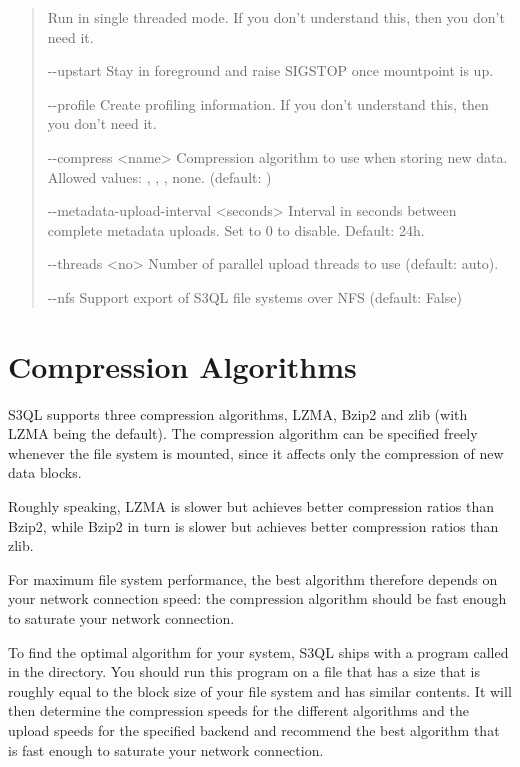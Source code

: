 \documentclass[letterpaper,10pt,english]{sphinxmanual}
\begin{document}
\begin{quote}
\begin{optionlist}{3cm}
Run in single threaded mode. If you don't understand
this, then you don't need it.
\item [-{-}upstart]  
Stay in foreground and raise SIGSTOP once mountpoint
is up.
\item [-{-}profile]  
Create profiling information. If you don't understand
this, then you don't need it.
\item [-{-}compress \textless{}name\textgreater{}]  
Compression algorithm to use when storing new data.
Allowed values: , , , none.
(default: )
\item [-{-}metadata-upload-interval \textless{}seconds\textgreater{}]  
Interval in seconds between complete metadata uploads.
Set to 0 to disable. Default: 24h.
\item [-{-}threads \textless{}no\textgreater{}]  
Number of parallel upload threads to use (default:
auto).
\item [-{-}nfs]  
Support export of S3QL file systems over NFS (default:
False)
\end{optionlist}
\end{quote}


\section{Compression Algorithms}
\label{mount:compression-algorithms}
S3QL supports three compression algorithms, LZMA, Bzip2 and zlib (with
LZMA being the default). The compression algorithm can be specified
freely whenever the file system is mounted, since it affects only the
compression of new data blocks.

Roughly speaking, LZMA is slower but achieves better compression
ratios than Bzip2, while Bzip2 in turn is slower but achieves better
compression ratios than zlib.

For maximum file system performance, the best algorithm therefore
depends on your network connection speed: the compression algorithm
should be fast enough to saturate your network connection.

To find the optimal algorithm for your system, S3QL ships with a
program called  in the  directory. You should
run this program on a file that has a size that is roughly equal to
the block size of your file system and has similar contents. It will
then determine the compression speeds for the different algorithms and
the upload speeds for the specified backend and recommend the best
algorithm that is fast enough to saturate your network connection.
\end{document}
